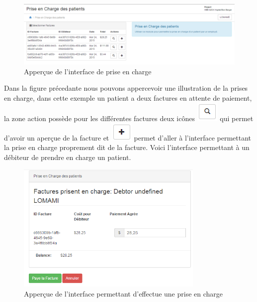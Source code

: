 \documentclass[12pt,a4paper]{report}
\begin{document}
\begin{figure}[h]
\begin{center}
\includegraphics[width=14cm]{pic/PriChPatientFact.png}
\end{center}
\caption{Apperçue de l'interface de prise en charge}
\label{Apperçue de l'interface de prise en charge}
\end{figure}

Dans la figure précedante nous pouvons appercevoir une illustration de la prises en charge, dans cette exemple un patient a deux factures en attente de paiement, la zone action possède pour les différentes factures deux icônes \includegraphics[scale=0.7]{pic/LoopBlack.png} qui permet d'avoir un aperçue de la facture et \includegraphics[scale=0.7]{pic/plusBlack.png} permet d'aller à l'interface permettant la prise en charge proprement dit de la facture. 
Voici l'interface permettant à un débiteur de prendre en charge un patient.

\begin{figure}[h]
\begin{center}
\includegraphics[width=9cm]{pic/SupportPatient.png}
\end{center}
\caption{Apperçue de l'interface permettant d'effectue une prise en charge}
\label{Apperçue de l'interface permettant d'effectue une prise en charge}
\end{figure}
\end{document}
